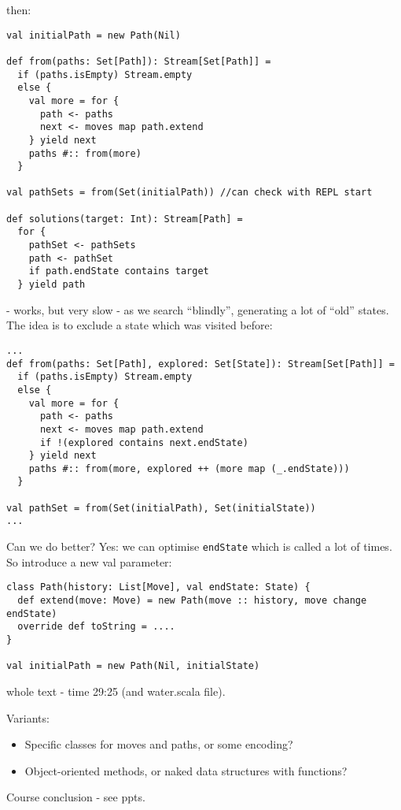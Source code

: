 \documentclass{scrartcl}
\begin{document}
then:
\begin{lstlisting}
val initialPath = new Path(Nil)

def from(paths: Set[Path]): Stream[Set[Path]] =
  if (paths.isEmpty) Stream.empty
  else {
    val more = for {
      path <- paths
      next <- moves map path.extend
    } yield next
    paths #:: from(more)
  }

val pathSets = from(Set(initialPath)) //can check with REPL start

def solutions(target: Int): Stream[Path] =
  for {
    pathSet <- pathSets
    path <- pathSet
    if path.endState contains target
  } yield path
\end{lstlisting}
- works, but very slow - as we search ``blindly'', generating a lot of ``old''
states. The idea is to exclude a state which was visited before:
\begin{lstlisting}
...
def from(paths: Set[Path], explored: Set[State]): Stream[Set[Path]] =
  if (paths.isEmpty) Stream.empty
  else {
    val more = for {
      path <- paths
      next <- moves map path.extend
      if !(explored contains next.endState)
    } yield next
    paths #:: from(more, explored ++ (more map (_.endState)))
  }

val pathSet = from(Set(initialPath), Set(initialState))
...
\end{lstlisting}
Can we do better? Yes: we can optimise \lstinline|endState| which is called a
lot of times. So introduce a new val parameter:
\begin{lstlisting}
class Path(history: List[Move], val endState: State) {
  def extend(move: Move) = new Path(move :: history, move change endState)
  override def toString = ....
}

val initialPath = new Path(Nil, initialState)
\end{lstlisting}
whole text - time 29:25 (and water.scala file).

Variants:
\begin{itemize}
\item Specific classes for moves and paths, or some encoding?
\item Object-oriented methods, or naked data structures with functions?
\end{itemize}

Course conclusion - see ppts.
\end{document}
